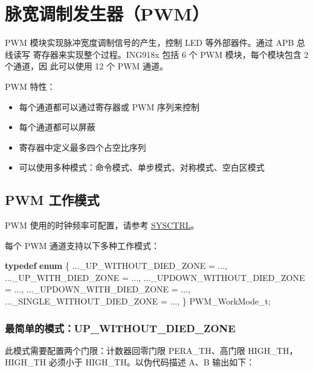 \documentclass[
  12pt,
]{book}
\newenvironment{Shaded}{\begin{snugshade}}{\end{snugshade}}
\newcommand{\KeywordTok}[1]{\textcolor[rgb]{0.13,0.29,0.53}{\textbf{#1}}}
\newcommand{\NormalTok}[1]{#1}
\providecommand{\tightlist}{%
  \setlength{\itemsep}{0pt}\setlength{\parskip}{0pt}}
\begin{document}
\hypertarget{ch-pwm}{%
\chapter{脉宽调制发生器（PWM）}\label{ch-pwm}}

PWM 模块实现脉冲宽度调制信号的产生，控制 LED 等外部器件。通过 APB 总线读写
寄存器来实现整个过程。ING918x 包括 6 个 PWM 模块，每个模块包含 2 个通道，因
此可以使用 12 个 PWM 通道。

PWM 特性：

\begin{itemize}
\tightlist
\item
  每个通道都可以通过寄存器或 PWM 序列来控制
\item
  每个通道都可以屏蔽
\item
  寄存器中定义最多四个占空比序列
\item
  可以使用多种模式：命令模式、单步模式、对称模式、空白区模式
\end{itemize}

\hypertarget{pwm-ux5de5ux4f5cux6a21ux5f0f}{%
\section{PWM 工作模式}\label{pwm-ux5de5ux4f5cux6a21ux5f0f}}

PWM 使用的时钟频率可配置，请参考 \protect\hyperlink{ch-sysctrl}{SYSCTRL}。

每个 PWM 通道支持以下多种工作模式：

\begin{Shaded}
\begin{Highlighting}[]
\KeywordTok{typedef} \KeywordTok{enum}
\NormalTok{\{}
\NormalTok{    ..._UP_WITHOUT_DIED_ZONE          = ...,}
\NormalTok{    ..._UP_WITH_DIED_ZONE             = ...,}
\NormalTok{    ..._UPDOWN_WITHOUT_DIED_ZONE      = ...,}
\NormalTok{    ..._UPDOWN_WITH_DIED_ZONE         = ...,}
\NormalTok{    ..._SINGLE_WITHOUT_DIED_ZONE      = ...,}
\NormalTok{\} PWM_WorkMode_t;}
\end{Highlighting}
\end{Shaded}

\hypertarget{ux6700ux7b80ux5355ux7684ux6a21ux5f0fup_without_died_zone}{%
\subsection{最简单的模式：UP\_WITHOUT\_DIED\_ZONE}\label{ux6700ux7b80ux5355ux7684ux6a21ux5f0fup_without_died_zone}}

此模式需要配置两个门限：计数器回零门限 PERA\_TH、高门限 HIGH\_TH，HIGH\_TH
必须小于 HIGH\_TH。以伪代码描述 A、B 输出如下：
\end{document}
